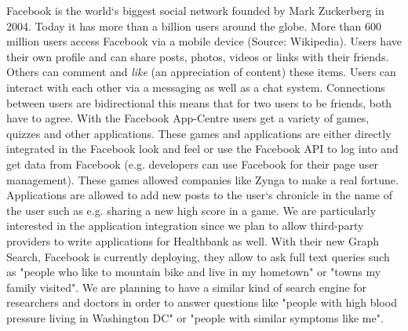 Facebook is the world`s biggest social network founded by Mark Zuckerberg in 2004. Today it has more than a billion users around the globe. More than 600 million users access Facebook via a mobile device (Source: Wikipedia). Users have their own profile and can share posts, photos, videos or links with their friends. Others can comment and \emph{like} (an appreciation of content) these items. Users can interact with each other via a messaging as well as a chat system. Connections between users are bidirectional this means that for two users to be friends, both have to agree. \newline
With the Facebook App-Centre users get a variety of games, quizzes and other applications. These games and applications are either directly integrated in the Facebook look and feel or use the Facebook API to log into and get data from Facebook (e.g. developers can use Facebook for their page user management). These games allowed companies like Zynga to make a real fortune. Applications are allowed to add new posts to the user`s chronicle in the name of the user such as e.g. sharing a new high score in a game. We are particularly interested in the application integration since we plan to allow third-party providers to write applications for Healthbank as well. \newline
With their new Graph Search, Facebook is currently deploying, they allow to ask full text queries such as "people who like to mountain bike and live in my hometown" or "towns my family visited". We are planning to have a similar kind of search engine for researchers and doctors in order to answer questions like "people with high blood pressure living in Washington DC" or "people with similar symptoms like me".